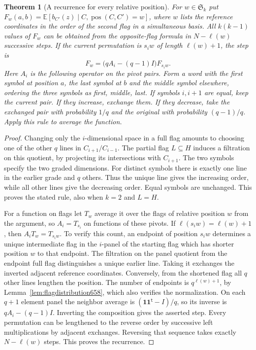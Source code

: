 \documentclass[a4paper,11pt]{article}
\newtheorem{theorem}[proposition]{Theorem}
\theoremstyle{definition}
\theoremstyle{remark}
\numberwithin{equation}{section}
\begin{document}
\begin{theorem}[A recurrence for every relative position]
\leavevmode\label{thm:pivotrecursion660}
For \(w\in\mathfrak S_k\) put
\(F_w(a,b)=\mathbb E[b_{C'}(z)\mid C,\operatorname{pos}(C,C')=w]\),
where \(w\) lists the reference coordinates in the order of the
second flag in a simultaneous basis. All \(k(k-1)\) values of
\(F_w\) can be obtained from the opposite-flag formula in
\(N-\ell(w)\) successive steps. If the current permutation is
\(s_i w\) of length \(\ell(w)+1\), the step is
\[
                   F_w=\big(qA_i-(q-1)I\big)F_{s_i w}.
\]
Here \(A_i\) is the following operator on the pivot pairs. Form a
word with the first symbol at position \(a\), the last symbol at
\(b\) and the middle symbol elsewhere, ordering the three symbols
as first, middle, last. If symbols \(i,i+1\) are equal, keep
the current pair. If they increase, exchange them. If they
decrease, take the exchanged pair with probability \(1/q\) and
the original with probability \((q-1)/q\). Apply this rule to
average the function.
\end{theorem}
\begin{proof}
Changing only the \(i\)-dimensional space in a full flag amounts
to choosing one of the other \(q\) lines in
\(C_{i+1}/C_{i-1}\). The partial flag \(L\subseteq H\) induces
a filtration on this quotient, by projecting its intersections
with \(C_{i+1}\). The two symbols specify the two graded
dimensions. For distinct symbols there is exactly one line
in the earlier grade and \(q\) others. Thus the unique line
gives the increasing order, while all other lines give the
decreasing order. Equal symbols are unchanged. This proves
the stated rule, also when \(k=2\) and \(L=H\).

For a function on flags let \(T_w\) average it over the flags
of relative position \(w\) from the argument, so \(A_i=T_{s_i}\)
on functions of these pivots. If \(\ell(s_i w)=\ell(w)+1\), then
\(A_iT_w=T_{s_i w}\). To verify this count, an endpoint of
position \(s_i w\) determines a unique intermediate flag in
the \(i\)-panel of the starting flag which has shorter position
\(w\) to that endpoint. The filtration on the panel quotient
from the endpoint full flag distinguishes a unique earlier
line. Taking it exchanges the inverted adjacent reference
coordinates. Conversely, from the shortened flag all \(q\)
other lines lengthen the position. The number of endpoints
is \(q^{\ell(w)+1}\), by Lemma~\ref{lem:flagdistribution658},
which also verifies the normalization. On each \(q+1\) element
panel the neighbor average is \((\mathbf1\mathbf1^{\mathsf t}-I)/q\),
so its inverse is \(qA_i-(q-1)I\). Inverting the composition
gives the asserted step. Every permutation can be lengthened
to the reverse order by successive left multiplications by
adjacent exchanges. Reversing that sequence takes exactly
\(N-\ell(w)\) steps. This proves the recurrence.
\end{proof}
\end{document}
